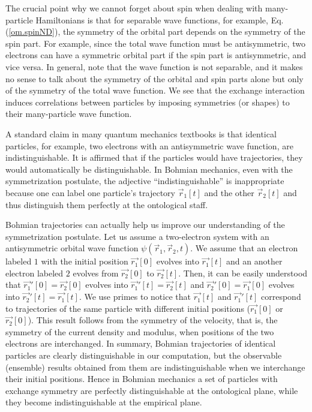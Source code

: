 \documentclass[nofootinbib, secnumarabic, amsmath, nobibnotes,11pt,aps,pra, floatfix]{revtex4-1}
\newcommand{\eref}[1]{Eq. (\ref{#1})}
\begin{document}
The crucial point why we cannot forget about spin when dealing with
many-particle Hamiltonians is that for separable wave
functions, for example, \eref{om.spinND}, the symmetry of the
orbital part depends on the symmetry of the spin part. For example,
since the total wave function must be antisymmetric, two electrons
can have a symmetric orbital part if the spin part is antisymmetric,
and vice versa. In general, note that the wave function is not
separable, and it makes no sense to talk about the symmetry of the
orbital and spin parts alone but only of the symmetry of the total
wave function. We see that the exchange interaction induces
correlations between particles by imposing symmetries (or shapes) to
their many-particle wave function.\enlargethispage{-1pc}

A standard claim in many quantum mechanics textbooks is that identical particles, for example, two electrons with an antisymmetric wave function, are indistinguishable. It is affirmed that if the particles would have trajectories, they would automatically be distinguishable. In Bohmian mechanics, even with the symmetrization postulate, the adjective ``indistinguishable'' is inappropriate because one can label one particle's trajectory $\vec r_1[t]$ and the other $\vec r_2[t]$ and thus distinguish them perfectly at the ontological staff.

Bohmian trajectories can actually help us improve our understanding of the symmetrization postulate. Let us assume a two-electron system with an antisymmetric orbital wave function $\psi(\vec r_1,\vec r_2,t)$. We assume that an electron labeled $1$ with the initial position $\vec {r_1}[0]$ evolves into $\vec {r_1}[t]$ and an another electron labeled $2$ evolves from $\vec {r_2}[0]$ to $\vec {r_2}[t]$. Then, it can be easily understood that $\vec {r_1}'[0] = \vec {r_2}[0]$ evolves into $\vec {r_1}'[t] = \vec {r_2}[t]$ and $\vec {r_2}'[0] = \vec {r_1}[0]$ evolves into $\vec {r_2}'[t] = \vec {r_1}[t]$. We use primes to notice that $\vec {r_1}[t]$ and $\vec {r_1}'[t]$ correspond to trajectories of the same particle with different initial positions ($\vec {r_1}[0]$ or $\vec {r_2}[0]$).
This result follows from the symmetry of the velocity, that is, the symmetry of the current density and modulus, when positions of the two electrons are interchanged. In summary, Bohmian trajectories of identical particles are clearly distinguishable in our computation, but the observable (ensemble) results obtained from them are indistinguishable when we interchange their initial positions. Hence in Bohmian mechanics a set of particles with exchange symmetry are perfectly distinguishable at the ontological plane, while they become indistinguishable at the empirical plane. 
\end{document}
